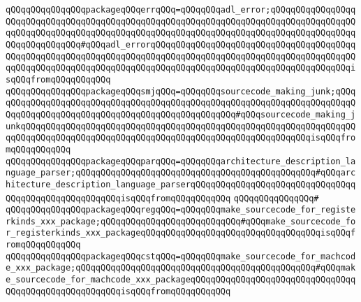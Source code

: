 \verb|qQQqqQQqqQQqqQQqpackageqQQqerrqQQq=qQQqqQQqadl_error;qQQqqQQqqQQqqQQqqQQqqQQqqQQqqQQqqQQqqQQqqQQqqQQqqQQqqQQqqQQqqQQqqQQqqQQqqQQqqQQqqQQqqQQqqQQqqQQqqQQqqQQqqQQqqQQqqQQqqQQqqQQqqQQqqQQqqQQqqQQqqQQqqQQqqQQqqQQqqQQqqQQqqQQqqQQq#qQQqadl_errorqQQqqQQqqQQqqQQqqQQqqQQqqQQqqQQqqQQqqQQqqQQqqQQqqQQqqQQqqQQqqQQqqQQqqQQqqQQqqQQqqQQqqQQqqQQqqQQqqQQqqQQqqQQqqQQqqQQqqQQqqQQqqQQqqQQqqQQqqQQqqQQqqQQqqQQqqQQqqQQqqQQqqQQqqQQqqQQqqQQqisqQQqfromqQQqqQQqqQQq|\newline
\verb|qQQqqQQqqQQqqQQqpackageqQQqsmjqQQq=qQQqqQQqsourcecode_making_junk;qQQqqQQqqQQqqQQqqQQqqQQqqQQqqQQqqQQqqQQqqQQqqQQqqQQqqQQqqQQqqQQqqQQqqQQqqQQqqQQqqQQqqQQqqQQqqQQqqQQqqQQqqQQqqQQqqQQqqQQq#qQQqsourcecode_making_junkqQQqqQQqqQQqqQQqqQQqqQQqqQQqqQQqqQQqqQQqqQQqqQQqqQQqqQQqqQQqqQQqqQQqqQQqqQQqqQQqqQQqqQQqqQQqqQQqqQQqqQQqqQQqqQQqqQQqqQQqqQQqqQQqisqQQqfromqQQqqQQqqQQq|\newline
\verb|qQQqqQQqqQQqqQQqpackageqQQqparqQQq=qQQqqQQqarchitecture_description_language_parser;qQQqqQQqqQQqqQQqqQQqqQQqqQQqqQQqqQQqqQQqqQQqqQQq#qQQqarchitecture_description_language_parserqQQqqQQqqQQqqQQqqQQqqQQqqQQqqQQqqQQqqQQqqQQqqQQqqQQqqQQqisqQQqfromqQQqqQQqqQQq|\newline
\verb|qQQqqQQqqQQqqQQq#|\newline
\verb|qQQqqQQqqQQqqQQqpackageqQQqregqQQq=qQQqqQQqmake_sourcecode_for_registerkinds_xxx_package;qQQqqQQqqQQqqQQqqQQqqQQqqQQq#qQQqmake_sourcecode_for_registerkinds_xxx_packageqQQqqQQqqQQqqQQqqQQqqQQqqQQqqQQqqQQqisqQQqfromqQQqqQQqqQQq|\newline
\verb|qQQqqQQqqQQqqQQqpackageqQQqcstqQQq=qQQqqQQqmake_sourcecode_for_machcode_xxx_package;qQQqqQQqqQQqqQQqqQQqqQQqqQQqqQQqqQQqqQQqqQQqqQQq#qQQqmake_sourcecode_for_machcode_xxx_packageqQQqqQQqqQQqqQQqqQQqqQQqqQQqqQQqqQQqqQQqqQQqqQQqqQQqqQQqisqQQqfromqQQqqQQqqQQq|\newline
